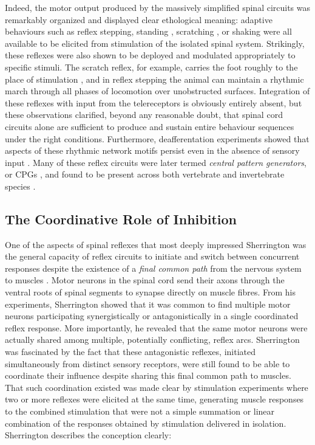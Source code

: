 Indeed, the motor output produced by the massively simplified spinal circuits was remarkably organized and displayed clear ethological meaning: adaptive behaviours such as reflex stepping, standing \cite{Sherrington1910, Sherrington1915}, scratching \cite{Sherrington1903}, or shaking \cite{Goltz1896, Sherrington1903} were all available to be elicited from stimulation of the isolated spinal system. Strikingly, these reflexes were also shown to be deployed and modulated appropriately to specific stimuli. The scratch reflex, for example, carries the foot roughly to the place of stimulation \cite{Sherrington1904}, and in reflex stepping the animal can maintain a rhythmic march through all phases of locomotion over unobstructed surfaces. Integration of these reflexes with input from the telereceptors is obviously entirely absent, but these observations clarified, beyond any reasonable doubt, that spinal cord circuits alone are sufficient to produce and sustain entire behaviour sequences under the right conditions. Furthermore, deafferentation experiments showed that aspects of these rhythmic network motifs persist even in the absence of sensory input \cite{GrahamBrown1911}. Many of these reflex circuits were later termed \emph{central pattern generators}, or CPGs \cite{Grillner1975, Grillner1981}, and found to be present across both vertebrate and invertebrate species \cite{Orlovsky1999,Selverston2010}.

\subsection{The Coordinative Role of Inhibition}

One of the aspects of spinal reflexes that most deeply impressed Sherrington was the general capacity of reflex circuits to initiate and switch between concurrent responses despite the existence of a \emph{final common path} from the nervous system to muscles \cite{Sherrington1904}. Motor neurons in the spinal cord send their axons through the ventral roots of spinal segments to synapse directly on muscle fibres. From his experiments, Sherrington showed that it was common to find multiple motor neurons participating synergistically or antagonistically in a single coordinated reflex response. More importantly, he revealed that the same motor neurons were actually shared among multiple, potentially conflicting, reflex arcs. Sherrington was fascinated by the fact that these antagonistic reflexes, initiated simultaneously from distinct sensory receptors, were still found to be able to coordinate their influence despite sharing this final common path to muscles. That such coordination existed was made clear by stimulation experiments where two or more reflexes were elicited at the same time, generating muscle responses to the combined stimulation that were not a simple summation or linear combination of the responses obtained by stimulation delivered in isolation. Sherrington describes the conception clearly:

